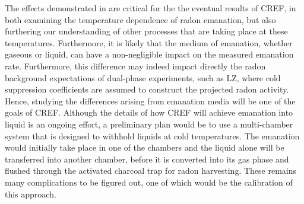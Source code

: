 The effects demonstrated in \cite{cold_radon_measurements} are critical for the the eventual results of CREF, in both examining the temperature dependence of radon emanation, but also furthering our understanding of other processes that are taking place at these temperatures. Furthermore, it is likely that the medium of emanation, whether gaseous or liquid, can have a non-negligible impact on the measured emanation rate. Furthermore, this difference may indeed impact directly the radon background expectations of dual-phase experiments, such as LZ, where cold suppression coefficients are assumed to construct the projected radon activity. Hence, studying the differences arising from emanation media will be one of the goals of CREF. Although the details of how CREF will achieve emanation into liquid is an ongoing effort, a preliminary plan would be to use a multi-chamber system that is designed to withhold liquids at cold temperatures. The emanation would initially take place in one of the chambers and the liquid alone will be transferred into another chamber, before it is converted into its gas phase and flushed through the activated charcoal trap for radon harvesting. These remains many complications to be figured out, one of which would be the calibration of this approach.